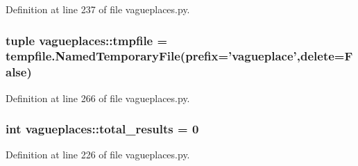 \-Definition at line 237 of file vagueplaces.\-py.

\hypertarget{namespacevagueplaces_a3b9ac6b99db27960b0431390dcd551cd}{
\subsubsection[{tmpfile}]{\setlength{\rightskip}{0pt plus 5cm}tuple {\bf vagueplaces\-::tmpfile} = tempfile.\-Named\-Temporary\-File(prefix='vagueplace',delete=\-False)}}\label{namespacevagueplaces_a3b9ac6b99db27960b0431390dcd551cd}


\-Definition at line 266 of file vagueplaces.\-py.

\hypertarget{namespacevagueplaces_aa2411570d3d42e5c2daf01af8c980b20}{
\subsubsection[{total\-\_\-results}]{\setlength{\rightskip}{0pt plus 5cm}int {\bf vagueplaces\-::total\-\_\-results} = 0}}\label{namespacevagueplaces_aa2411570d3d42e5c2daf01af8c980b20}


\-Definition at line 226 of file vagueplaces.\-py.

